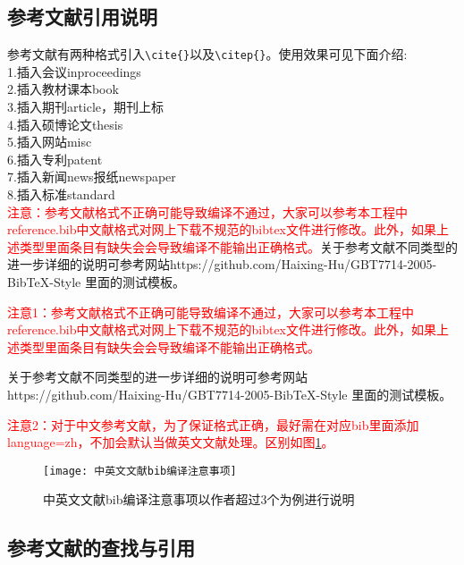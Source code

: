 \documentclass[course_p]{hdu-report}
\begin{document}
\subsection{参考文献引用说明}
参考文献有两种格式引入\verb+\cite{}+以及\verb+\citep{}+。使用效果可见下面介绍:\\
1.插入会议inproceedings\cite{zhao2015bearing0}\\
2.插入教材课本book\cite{williams1991probability,chengzhaolin2006}\\
3.插入期刊article\cite{cao2011formation,xue2015formation}，期刊上标\citep{xue2015formation}\\
4.插入硕博论文thesis\cite{lisi2015,wangwu2015,deans2005bearings}\\
5.插入网站misc\cite{irdawebsite,h7n9,wikipedia_moores_law}\\
6.插入专利patent\cite{xiao2012yi,p6915001}\\
7.插入新闻news报纸newspaper\cite{zhang2000,renminribao}\\
8.插入标准standard\cite{gbt3469-1983}\\
\textcolor{red}{注意：参考文献格式不正确可能导致编译不通过，大家可以参考本工程中reference.bib中文献格式对网上下载不规范的bibtex文件进行修改。此外，如果上述类型里面条目有缺失会会导致编译不能输出正确格式。}关于参考文献不同类型的进一步详细的说明可参考网站https://github.com/Haixing-Hu/GBT7714-2005-BibTeX-Style
里面的测试模板。



\textcolor{red}{注意1：参考文献格式不正确可能导致编译不通过，大家可以参考本工程中reference.bib中文献格式对网上下载不规范的bibtex文件进行修改。此外，如果上述类型里面条目有缺失会会导致编译不能输出正确格式。}

关于参考文献不同类型的进一步详细的说明可参考网站https://github.com/Haixing-Hu/GBT7714-2005-BibTeX-Style
里面的测试模板。


\textcolor{red}{注意2：对于中文参考文献，为了保证格式正确，最好需在对应bib里面添加language={zh}，不加会默认当做英文文献处理。区别如图\ref{fig_bib0}。}

\begin{figure}[!htb]
  \centering
  \texttt{[image: 中英文文献bib编译注意事项]}
  \caption{中英文文献bib编译注意事项以作者超过3个为例进行说明}
  \label{fig_bib0}
\end{figure}


\subsection{参考文献的查找与引用}
\end{document}
